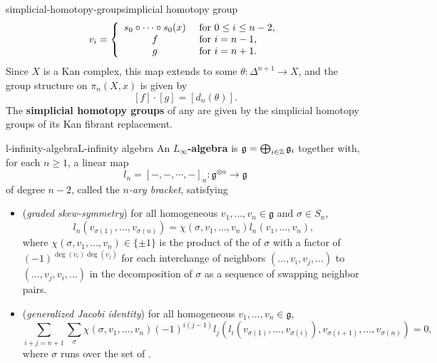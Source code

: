 \begin{topic}{simplicial-homotopy-group}{simplicial homotopy group}
    \[ v_i = \left\{ \begin{array}{cl}
        s_0 \circ \cdots \circ s_0 (x) & \textup{ for } 0 \le i \le n - 2, \\
        f & \textup{ for } i = n - 1, \\
        g & \textup{ for } i = n + 1.
    \end{array} \right. \]
    Since $X$ is a Kan complex, this map extends to some $\theta : \Delta^{n + 1} \to X$, and the group structure on $\pi_n(X, x)$ is given by
    \[ [f] \cdot [g] = [d_n(\theta)] . \]
    The \textbf{simplicial homotopy groups} of any  are given by the simplicial homotopy groups of its Kan fibrant replacement.
\end{topic}

\begin{topic}{l-infinity-algebra}{L-infinity algebra}
    An \textbf{$L_\infty$-algebra} is   $\mathfrak{g} = \bigoplus_{i \in \mathbb{Z}} \mathfrak{g}_i$ together with, for each $n \ge 1$, a linear map
    \[ l_n = [-, -, \cdots, -]_n : \mathfrak{g}^{\otimes n} \to \mathfrak{g} \]
    of degree $n - 2$, called the \textit{$n$-ary bracket}, satisfying
    \begin{itemize}
        \item (\textit{graded skew-symmetry}) for all homogeneous $v_1, \ldots, v_n \in \mathfrak{g}$ and  $\sigma \in S_n$,
        \[ l_n(v_{\sigma(1)}, \ldots, v_{\sigma(n)}) = \chi(\sigma, v_1, \ldots, v_n) l_n(v_1, \ldots, v_n) , \]
        where $\chi(\sigma, v_1, \ldots, v_n) \in \{ \pm 1 \}$ is the product of the  of $\sigma$ with a factor of $(-1)^{\deg(v_i) \deg(v_j)}$ for each interchange of neighbors $(\ldots, v_i, v_j, \ldots)$ to $(\ldots, v_j, v_i, \ldots)$ in the decomposition of $\sigma$ as a sequence of swapping neighbor pairs.
        \item (\textit{generalized Jacobi identity}) for all homogeneous $v_1, \ldots, v_n \in \mathfrak{g}$,
        \[ \sum_{i + j = n + 1} \sum_{\sigma} \chi(\sigma, v_1, \ldots, v_n) (-1)^{i(j - 1)} l_j(l_i(v_{\sigma(1)}, \ldots, v_{\sigma(i)}), v_{\sigma(i + 1)}, \ldots, v_{\sigma(n)}) = 0 , \]
        where $\sigma$ runs over the set of .
    \end{itemize}
\end{topic}

